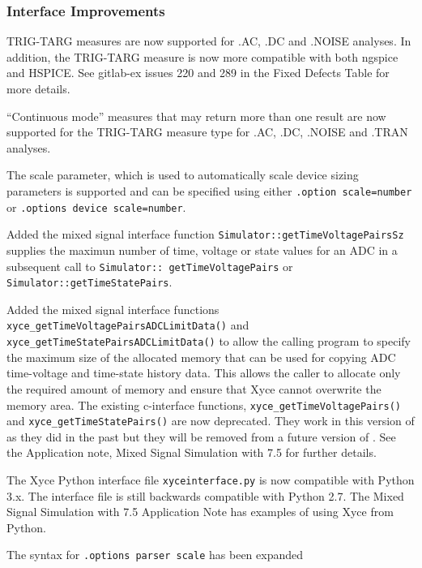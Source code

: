 \documentclass[letterpaper]{scrartcl}
\begin{document}
\subsubsection*{Interface Improvements}
\begin{XyceItemize}
  \item TRIG-TARG measures are now supported for .AC, .DC and .NOISE
    analyses.  In addition, the TRIG-TARG measure is now more
    compatible with both ngspice and HSPICE.  See gitlab-ex issues 220
    and 289 in the Fixed Defects Table for more details.
  \item ``Continuous mode'' measures that may return more than one
    result are now supported for the TRIG-TARG measure type for .AC,
    .DC, .NOISE and .TRAN analyses.
  \item The scale parameter, which is used to automatically scale
    device sizing parameters is supported and can be specified using
    either \texttt{.option scale=number} or \texttt{.options device
      scale=number}.
  \item Added the mixed signal interface function
    \texttt{Simulator::getTimeVoltagePairsSz} supplies the maximun
    number of time, voltage or state values for an ADC in a subsequent
    call to \texttt{Simulator:: getTimeVoltagePairs} or
    \texttt{Simulator::getTimeStatePairs}.
  \item Added the mixed signal interface functions
    \texttt{xyce\_getTimeVoltagePairs\-ADCLimitData()} and
    \texttt{xyce\-\_getTimeStatePairs\-ADCLimitData()} to allow the
    calling program to specify the maximum size of the allocated
    memory that can be used for copying ADC time-voltage and
    time-state history data.  This allows the caller to allocate only
    the required amount of memory and ensure that Xyce cannot
    overwrite the memory area.  The existing c-interface functions,
    \texttt{xyce\_getTimeVoltagePairs()} and
    \texttt{xyce\_getTimeStatePairs()} are now deprecated. They work
    in this version of \Xyce{} as they did in the past but they will
    be removed from a future version of \Xyce{}.  See the Application
    note, Mixed Signal Simulation with \Xyce{} 7.5 for further
    details.
  \item The Xyce Python interface file \texttt{xyce\-interface.py} is
    now compatible with Python 3.x.  The interface file is still
    backwards compatible with Python 2.7. The Mixed Signal Simulation
    with \Xyce{} 7.5 Application Note has examples of using Xyce from
    Python.
 \item The syntax for \texttt{.options parser scale} has been expanded

\end{XyceItemize}
\end{document}
